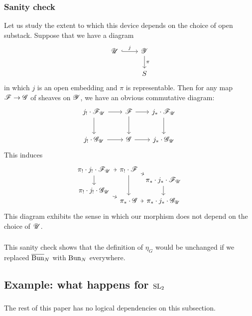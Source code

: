 \subsubsection{Sanity check} Let us study the extent to which this device depends on the choice of open substack. Suppose that we have a diagram
\[
\begin{tikzcd}
  \UU \arrow[r, hook, "j"] & \YY \arrow[d, "\pi"] \\
  & S
\end{tikzcd}
\]
in which $j$ is an open embedding and $\pi$ is representable. Then for any map $\mathscr{F} \to \mathscr{G}$ of sheaves on $\mathscr{Y}$, we have an obvious commutative diagram:
\[
\begin{tikzcd}[
  column sep={5em,between origins},
  row sep={4em,between origins}
]
  j_! \cdot \FF_\UU \arrow[r] \arrow[d] & \FF \arrow[r] \arrow[d] & j_* \cdot \FF_\UU \arrow[d] \\
  j_! \cdot \GG_\UU \arrow[r] & \GG \arrow[r] & j_* \cdot \GG_\UU
\end{tikzcd}
\]
This induces
\[
\begin{tikzcd}[
  column sep={5em,between origins},
  row sep={1.5em,between origins}
]
  \pi_! \cdot j_! \cdot \FF_\UU \arrow[r] \arrow[dd] & \pi_! \cdot \FF \arrow[dr] \arrow[ddd] & \\
   & & \pi_* \cdot j_* \cdot \FF_\UU \arrow[dd] \\
  \pi_! \cdot j_! \cdot \GG_\UU \arrow[dr] & & \\
   & \pi_* \cdot \GG \arrow[r] & \pi_* \cdot j_* \cdot \GG_\UU
\end{tikzcd}
\]
This diagram exhibits the sense in which our morphism does not depend on the choice of $\mathscr{U}$. 

\subsubsection{} This sanity check shows that the definition of $\eta_G$ would be unchanged if we replaced $\overline{\mathrm{Bun}}_N$ with $\mathrm{Bun}_N$ everywhere.

\subsection{Example: what happens for $\mathrm{SL}_2$}

\subsubsection{} The rest of this paper has no logical dependencies on this subsection.


